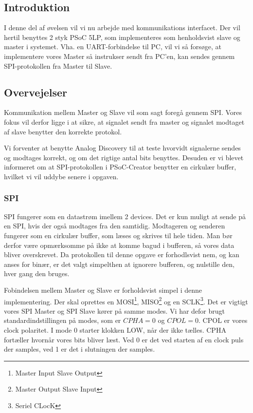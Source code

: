 \documentclass[../main.tex]{subfiles}
\begin{document}
\subsection{Introduktion}
I denne del af øvelsen vil vi nu arbejde med kommunikations interfacet. Der vil hertil benyttes 2 styk PSoC 5LP, som implementeres som henholdsvist slave og master i systemet.
Vha. en UART-forbindelse til PC, vil vi så forsøge, at implementere vores Master så instrukser sendt fra PC'en, kan sendes gennem SPI-protokollen fra Master til Slave.

\subsection{Overvejelser}
Kommunikation mellem Master og Slave vil som sagt foregå gennem SPI. Vores fokus vil derfor ligge i at sikre, at signalet sendt fra master og signalet modtaget af slave benytter den korrekte protokol.

Vi forventer at benytte Analog Discovery til at teste hvorvidt signalerne sendes og modtages korrekt, og om det rigtige antal bits benyttes. Desuden er vi blevet informeret om at SPI-protokollen i PSoC-Creator benytter en cirkulær buffer, hvilket vi vil uddybe senere i opgaven.

\subsubsection{SPI}

SPI fungerer som en datastrøm imellem 2 devices. Det er kun muligt at sende på en SPI, hvis der også modtages fra den samtidig. Modtageren og senderen fungerer som en cirkulær buffer, som læses og skrives til hele tiden. Man bør derfor være opmærksomme på ikke at komme bagud i bufferen, så vores data bliver overskrevet. Da protokollen til denne opgave er forhodlsvist nem, og kan anses for binær, er det valgt simpelthen at ignorere bufferen, og nulstille den, hver gang den bruges.

Fobindelsen mellem Master og Slave er forholdsvist simpel i denne implementering. Der skal oprettes en MOSI\footnote{Master Input Slave Output}, MISO\footnote{Master Output Slave Input} og en SCLK\footnote{Seriel CLocK}. Det er vigtigt vores SPI Master og SPI Slave kører på samme modes. Vi har defor brugt standardindstillingen på modes, som er \(CPHA = 0\) og \(CPOL = 0\). CPOL er vores clock polaritet. I mode 0 starter klokken LOW, når der ikke tælles. CPHA fortæller hvornår vores bits bliver læst. Ved 0 er det ved starten af en clock puls der samples, ved 1 er det i slutningen der samples.
\end{document}
